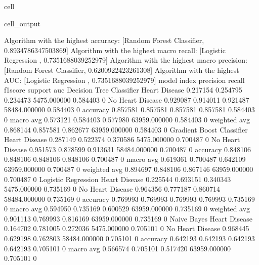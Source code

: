 \documentclass[letterpaper,10pt,english]{jupyterBook}
\begin{document}
\begin{sphinxuseclass}{cell}
\begin{sphinxVerbatimOutput}
\begin{sphinxuseclass}{cell_output}
\begin{sphinxVerbatim}[commandchars=\\\{\}]
Algorithm with the highest accuracy: [\PYGZsq{}Random Forest Classifier\PYGZsq{}, 0.8934786347503869]
Algorithm with the highest macro recall:
        [\PYGZsq{}Logistic Regression \PYGZsq{}, 0.7351688039252979]
Algorithm with the highest macro precision:
        [\PYGZsq{}Random Forest Classifier\PYGZsq{}, 0.6200922423261308]
Algorithm with the highest AUC:
        [\PYGZsq{}Logistic Regression \PYGZsq{}, 0.7351688039252979]
model                      index             precision  recall    f1\PYGZhy{}score  support       auc     
Decision Tree Classifier   Heart Disease     0.217154   0.254795  0.234473  5475.000000   0.584403    0
                           No Heart Disease  0.929087   0.914011  0.921487  58484.000000  0.584403    0
                           accuracy          0.857581   0.857581  0.857581  0.857581      0.584403    0
                           macro avg         0.573121   0.584403  0.577980  63959.000000  0.584403    0
                           weighted avg      0.868144   0.857581  0.862677  63959.000000  0.584403    0
Gradient Boost Classifier  Heart Disease     0.287149   0.522374  0.370586  5475.000000   0.700487    0
                           No Heart Disease  0.951573   0.878599  0.913631  58484.000000  0.700487    0
                           accuracy          0.848106   0.848106  0.848106  0.848106      0.700487    0
                           macro avg         0.619361   0.700487  0.642109  63959.000000  0.700487    0
                           weighted avg      0.894697   0.848106  0.867146  63959.000000  0.700487    0
Logistic Regression        Heart Disease     0.225544   0.693151  0.340343  5475.000000   0.735169    0
                           No Heart Disease  0.964356   0.777187  0.860714  58484.000000  0.735169    0
                           accuracy          0.769993   0.769993  0.769993  0.769993      0.735169    0
                           macro avg         0.594950   0.735169  0.600529  63959.000000  0.735169    0
                           weighted avg      0.901113   0.769993  0.816169  63959.000000  0.735169    0
Naive Bayes                Heart Disease     0.164702   0.781005  0.272036  5475.000000   0.705101    0
                           No Heart Disease  0.968445   0.629198  0.762803  58484.000000  0.705101    0
                           accuracy          0.642193   0.642193  0.642193  0.642193      0.705101    0
                           macro avg         0.566574   0.705101  0.517420  63959.000000  0.705101    0

\end{sphinxVerbatim}
\end{sphinxuseclass}
\end{sphinxVerbatimOutput}
\end{sphinxuseclass}
\end{document}
